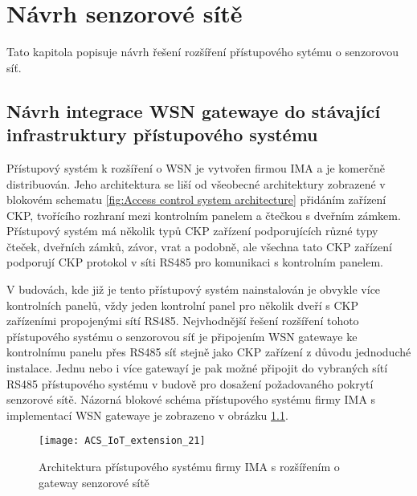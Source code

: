 \chapter{Návrh senzorové sítě}
\label{Návrh WSN}
Tato kapitola popisuje návrh řešení rozšíření přístupového sytému o senzorovou síť.


\section{Návrh integrace WSN gatewaye do stávající infrastruktury přístupového systému}
\label{Implementace WSN do přístupového systému}
Přístupový systém k rozšíření o WSN je vytvořen firmou IMA a je komerčně distribuován. Jeho architektura se liší od všeobecné architektury zobrazené v blokovém schematu \ref{fig:Access control system architecture} přidáním zařízení CKP, tvořícího rozhraní mezi kontrolním panelem a čtečkou s dveřním zámkem. Přístupový systém má několik typů CKP zařízení podporujících různé typy čteček, dveřních zámků, závor, vrat a podobně, ale všechna tato CKP zařízení podporují CKP protokol v síti RS485 pro komunikaci s kontrolním panelem.

V budovách, kde již je tento přístupový systém nainstalován je obvykle více kontrolních panelů, vždy jeden kontrolní panel pro několik dveří s CKP zařízeními propojenými sítí RS485. 
Nejvhodnější řešení rozšíření tohoto přístupového systému o senzorovou síť je připojením WSN gatewaye ke kontrolnímu panelu přes RS485 síť stejně jako CKP zařízení z důvodu jednoduché instalace. Jednu nebo i více gatewayí je pak možné připojit do vybraných sítí RS485 přístupového systému v budově pro dosažení požadovaného pokrytí senzorové sítě.
Názorná blokové schéma přístupového systému firmy IMA s implementací WSN gatewaye je zobrazeno v obrázku \ref{fig:ACS architecture IMA with geteway}.

\begin{figure}[!h]
\centering
\texttt{[image: ACS\_IoT\_extension\_21]}
\caption{Architektura přístupového systému firmy IMA s rozšířením o gateway senzorové sítě}
\label{fig:ACS architecture IMA with geteway}
\end{figure}

